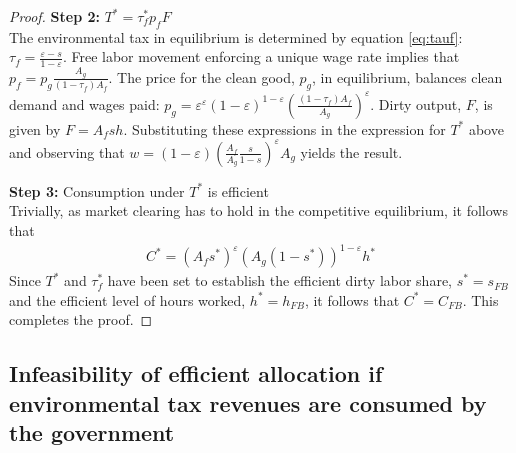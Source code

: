 \begin{proof}
\textbf{Step 2:} $T^*=\tau_f^*p_fF$\\
The environmental tax in equilibrium is determined by equation \ref{eq:tauf}: $\tau_f = \frac{\varepsilon-s}{1-\varepsilon}$. Free labor movement enforcing a unique wage rate implies that $p_f=p_g\frac{A_g}{(1-\tau_f)A_f}$. The price for the clean good, $p_g$, in equilibrium, balances clean demand and wages paid: $p_g=\varepsilon^\varepsilon(1-\varepsilon)^{1-\varepsilon}\left(\frac{(1-\tau_f)A_f}{A_g}\right)^\varepsilon$. Dirty output, $F$, is given by $F=A_fsh$. 
Substituting these expressions in the expression for $T^*$ above and observing that $w=(1-\varepsilon)\left(\frac{A_f}{A_g}\frac{s}{1-s}\right)^\varepsilon A_g$ yields the result.

\textbf{Step 3: } Consumption under $T^*$ is efficient\\
Trivially, as market clearing has to hold in the competitive equilibrium, it follows that 
\begin{align}
C^*=\left(A_f s^*\right)^\varepsilon\left(A_g(1-s^*)\right)^{1-\varepsilon}h^*
\end{align} 
Since $T^*$ and $\tau_f^*$ have been set to establish the efficient dirty labor share, $s^*=s_{FB}$ and the efficient level of hours worked, $h^*=h_{FB}$, it follows that $C^*=C_{FB}$. This completes the proof.
\end{proof}

\subsection{Infeasibility of efficient allocation if environmental tax revenues are consumed by the government}

